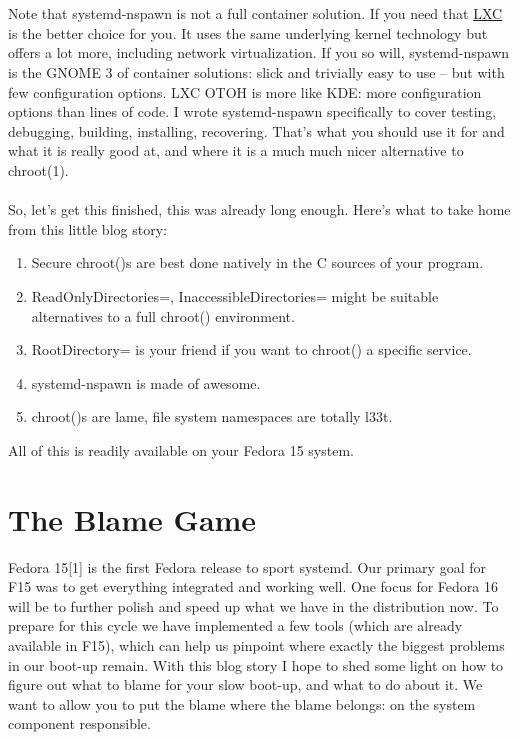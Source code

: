 \documentclass[titlepage]{article}
\begin{document}
\\
\\
Note that systemd-nspawn is not a full container solution. If you need that \href{http://lxc.sourceforge.net/}{LXC} is the better choice for you. It uses the same underlying kernel technology but offers a lot more, including network virtualization. If you so will, systemd-nspawn is the GNOME 3 of container solutions: slick and trivially easy to use -- but with few configuration options. LXC OTOH is more like KDE: more configuration options than lines of code. I wrote systemd-nspawn specifically to cover testing, debugging, building, installing, recovering. That's what you should use it for and what it is really good at, and where it is a much much nicer alternative to chroot(1).
\\
\\
So, let's get this finished, this was already long enough. Here's what to take home from this little blog story:
\begin{enumerate}
\item
Secure chroot()s are best done natively in the C sources of your program.
\item
ReadOnlyDirectories=, InaccessibleDirectories= might be suitable alternatives to a full chroot() environment.
\item
RootDirectory= is your friend if you want to chroot() a specific service.
\item
systemd-nspawn is made of awesome.
\item
chroot()s are lame, file system namespaces are totally l33t.
\end{enumerate}
All of this is readily available on your Fedora 15 system.
\section{The Blame Game}
Fedora 15[1] is the first Fedora release to sport systemd. Our primary goal for F15 was to get everything integrated and working well. One focus for Fedora 16 will be to further polish and speed up what we have in the distribution now. To prepare for this cycle we have implemented a few tools (which are already available in F15), which can help us pinpoint where exactly the biggest problems in our boot-up remain. With this blog story I hope to shed some light on how to figure out what to blame for your slow boot-up, and what to do about it. We want to allow you to put the blame where the blame belongs: on the system component responsible.
\end{document}
